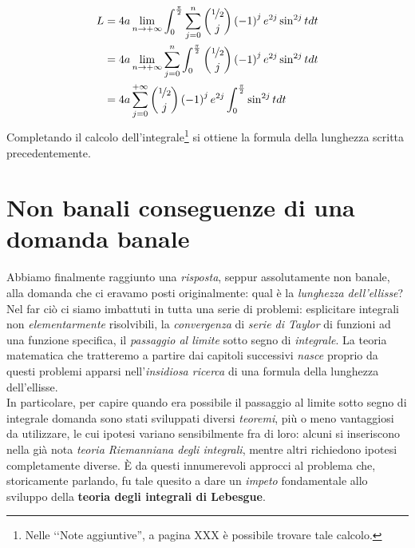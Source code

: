 \begin{align*}
	L&=4a\lim_{n\to +\infty}\int_{0}^{\frac{\pi}{2}}\sum_{j=0}^{n}\binom{\nicefrac{1}{2}}{j}\left(-1\right)^je^{2j}\sin^{2j}tdt\\
	&=4a\lim_{n\to +\infty}\sum_{j=0}^{n}\int_{0}^{\frac{\pi}{2}}\binom{\nicefrac{1}{2}}{j}\left(-1\right)^je^{2j}\sin^{2j}tdt\\
	&=4a\sum_{j=0}^{+\infty}\binom{\nicefrac{1}{2}}{j}\left(-1\right)^je^{2j}\int_{0}^{\frac{\pi}{2}}\sin^{2j}tdt
\end{align*}
Completando il calcolo dell'integrale\footnote{Nelle ‘‘Note aggiuntive'', a pagina XXX è possibile trovare tale calcolo.} si ottiene la formula della lunghezza scritta precedentemente.\\
\section{Non banali conseguenze di una domanda banale}
Abbiamo finalmente raggiunto una \textit{risposta}, seppur assolutamente non banale, alla domanda che ci eravamo posti originalmente: qual è la \textit{lunghezza dell'ellisse}? Nel far ciò ci siamo imbattuti in tutta una serie di problemi: esplicitare integrali non \textit{elementarmente} risolvibili, la \textit{convergenza} di \textit{serie di Taylor} di funzioni ad una funzione specifica, il \textit{passaggio al limite} sotto segno di \textit{integrale}.
La teoria matematica che tratteremo a partire dai capitoli successivi \textit{nasce} proprio da questi problemi apparsi nell'\textit{insidiosa ricerca} di una formula della lunghezza dell'ellisse.\\
In particolare, per capire quando era possibile il passaggio al limite sotto segno di integrale domanda sono stati sviluppati diversi \textit{teoremi}, più o meno vantaggiosi da utilizzare, le cui ipotesi variano sensibilmente fra di loro: alcuni si inseriscono nella già nota \textit{teoria Riemanniana degli integrali}, mentre altri richiedono ipotesi completamente diverse. È da questi innumerevoli approcci al problema che, storicamente parlando, fu tale quesito a dare un \textit{impeto} fondamentale allo sviluppo della \textbf{teoria degli integrali di Lebesgue}.
